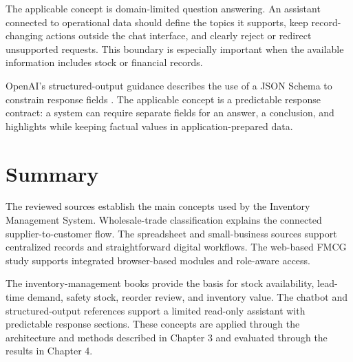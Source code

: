 The applicable concept is domain-limited question answering. An assistant connected to operational data should define the topics it supports, keep record-changing actions outside the chat interface, and clearly reject or redirect unsupported requests. This boundary is especially important when the available information includes stock or financial records.

OpenAI's structured-output guidance describes the use of a JSON Schema to constrain response fields \cite{openai_structured_outputs}. The applicable concept is a predictable response contract: a system can require separate fields for an answer, a conclusion, and highlights while keeping factual values in application-prepared data.

\section{Summary}
The reviewed sources establish the main concepts used by the Inventory Management System. Wholesale-trade classification explains the connected supplier-to-customer flow. The spreadsheet and small-business sources support centralized records and straightforward digital workflows. The web-based FMCG study supports integrated browser-based modules and role-aware access.

The inventory-management books provide the basis for stock availability, lead-time demand, safety stock, reorder review, and inventory value. The chatbot and structured-output references support a limited read-only assistant with predictable response sections. These concepts are applied through the architecture and methods described in Chapter 3 and evaluated through the results in Chapter 4.
